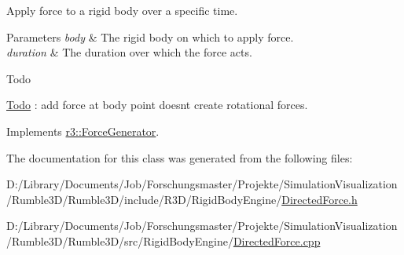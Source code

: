 Apply force to a rigid body over a specific time. 


\begin{DoxyParams}{Parameters}
{\em body} & The rigid body on which to apply force. \\
\hline
{\em duration} & The duration over which the force acts. \\
\hline
\end{DoxyParams}
\begin{DoxyRefDesc}{Todo}
\item[\mbox{\hyperlink{todo__todo000016}{Todo}}]\+: add force at body point doesn\textquotesingle{}t create rotational forces. \end{DoxyRefDesc}


Implements \mbox{\hyperlink{classr3_1_1_force_generator_a69bebbde8cef792d6636af50037af2aa}{r3\+::\+Force\+Generator}}.



The documentation for this class was generated from the following files\+:\begin{DoxyCompactItemize}
\item 
D\+:/\+Library/\+Documents/\+Job/\+Forschungsmaster/\+Projekte/\+Simulation\+Visualization/\+Rumble3\+D/\+Rumble3\+D/include/\+R3\+D/\+Rigid\+Body\+Engine/\mbox{\hyperlink{_directed_force_8h}{Directed\+Force.\+h}}\item 
D\+:/\+Library/\+Documents/\+Job/\+Forschungsmaster/\+Projekte/\+Simulation\+Visualization/\+Rumble3\+D/\+Rumble3\+D/src/\+Rigid\+Body\+Engine/\mbox{\hyperlink{_directed_force_8cpp}{Directed\+Force.\+cpp}}\end{DoxyCompactItemize}
